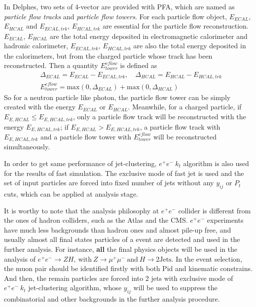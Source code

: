 \documentclass[a4paper,10pt,twoside]{cpc-hepnp}
\begin{document}
In Delphes, two sets of 4-vector are provided with PFA, which are named as {\it{particle flow tracks}} and {\it{particle flow towers}}. For each particle flow object, $E_{ECAL}$, $E_{HCAL}$ and $E_{ECAL, trk}$, $E_{HCAL, trk}$ are essential for the particle flow reconstruction. $E_{ECAL}$, $E_{HCAL}$ are the total energy deposited in electromagnetic calorimeter and hadronic calorimeter, $E_{ECAL, trk}$, $E_{HCAL, trk}$ are also the total energy deposited in the calorimeters, but from the charged particle whose track has been reconstructed. Then a quantity $E^{eflow}_{tower}$ is defined as
\begin{eqnarray}
&\Delta_{ECAL}=E_{ECAL}-E_{ECAL, trk}, \quad\Delta_{HCAL}=E_{HCAL}-E_{HCAL, trk}\\
&E^{eflow}_{tower}=\mathrm{max}(0,\Delta_{ECAL})+\mathrm{max}(0,\Delta_{HCAL})
\end{eqnarray}
So for a neutron particle like photon, the particle flow tower can be simply created with the energy $E_{ECAL}$ or $E_{HCAL}$. Meanwhile, for a charged particle,  if $E_{E,HCAL}\le E_{E,HCAL,trk}$, only a particle flow track will be reconstructed with the energy $E_{E,HCAL,trk}$; if $E_{E,HCAL}>E_{E,HCAL,trk}$, a particle flow track with $E_{E,HCAL,trk}$ and a particle flow tower with $E^{eflow}_{tower}$ will be reconstructed simultaneously.

In order to get same performance of jet-clustering, $e^+e^-~k_t$ algorithm is also used for the results of fast simulation. The exclusive mode of fast jet is used and  the set of  input particles are forced into fixed number of jets without any $y_{ij}$ or $P_t$ cuts, which can be applied at analysis stage.  

It is worthy to note that the analysis philosophy at $e^+e^-$ collider is different from the ones  of hadron colliders, such as the Atlas and the CMS.  $e^+e^-$ experiments have much less backgrounds than hadron ones and almost pile-up free, and usually almost all final states particles of a event are detected and used in the further analysis.   For instance, {\bf all} the final physics objects will be used in the analysis of $e^+e^- \to ZH,~\mbox{with}~Z \to\mu^+\mu^-~\mbox{and}~H \to 2\mbox{Jets} $. In the event selection, the muon pair should be identified firstly with both Pid and kinematic constrains. And then, the remain particles are forced into 2 jets with exclusive mode of $e^+e^-~k_t$ jet-clustering algorithm, whose $y_{ij}$ will be used to suppress the combinatorial and other backgrounds in the further analysis procedure. 
\end{document}
